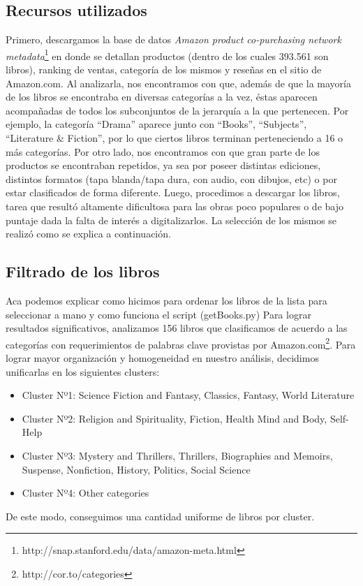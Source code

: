 \documentclass[12pt,journal,compsoc]{IEEEtran}
\begin{document}
\subsection{Recursos utilizados}
Primero, descargamos la base de datos \textit{Amazon product co-purchasing network metadata}\footnote{http://snap.stanford.edu/data/amazon-meta.html} en donde se detallan productos (dentro de los cuales 393.561 son libros), ranking de ventas, categoría de los mismos y reseñas en el sitio de Amazon.com. Al analizarla, nos encontramos con que, además de que la mayoría de los libros se encontraba en diversas categorías a la vez, éstas aparecen acompañadas de todos los subconjuntos de la jerarquía a la que pertenecen. Por ejemplo, la categoría ``Drama'' aparece junto con ``Books'', ``Subjects'', ``Literature \& Fiction'', por lo que ciertos libros terminan perteneciendo a 16 o más categorías. Por otro lado, nos encontramos con que gran parte de los productos se encontraban repetidos, ya sea por poseer distintas ediciones, distintos formatos (tapa blanda/tapa dura, con audio, con dibujos, etc) o por estar clasificados de forma diferente. 
Luego, procedimos a descargar los libros, tarea que resultó altamente dificultosa para las obras poco populares o de bajo puntaje dada la falta de interés a digitalizarlos. La selección de los mismos se realizó como se explica a continuación.

\subsection{Filtrado de los libros} Aca podemos explicar como hicimos para ordenar los libros de la lista para seleccionar a mano y como funciona el script (getBooks.py)
Para lograr resultados significativos, analizamos 156 libros que clasificamos de acuerdo a las categorías con requerimientos de palabras clave provistas por Amazon.com\footnote{http://cor.to/categories}. Para lograr mayor organización y homogeneidad en nuestro análisis, decidimos unificarlas en los siguientes clusters:
\begin{itemize}
\item Cluster Nº1: Science Fiction and Fantasy, Classics, Fantasy, World Literature
\item Cluster Nº2: Religion and Spirituality, Fiction, Health Mind and Body, Self-Help
\item Cluster Nº3: Mystery and Thrillers, Thrillers, Biographies and Memoirs, Suspense, Nonfiction, History, Politics, Social Science
\item Cluster Nº4: Other categories
\end{itemize}
De este modo, conseguimos una cantidad uniforme de libros por cluster.
\end{document}
